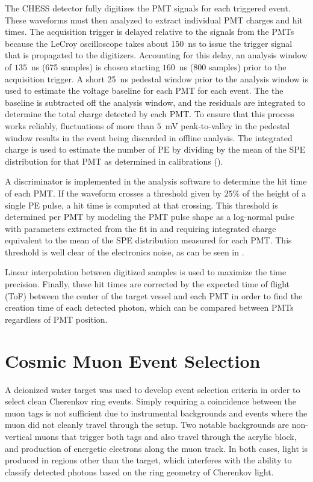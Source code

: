 The CHESS detector fully digitizes the PMT signals for each triggered event.
These waveforms must then analyzed to extract individual PMT charges and hit times. 
The acquisition trigger is delayed relative to the signals from the PMTs because the LeCroy oscilloscope takes about 150~ns to issue the trigger signal that is propagated to the digitizers. 
Accounting for this delay, an analysis window of $135$~ns (675 samples) is chosen starting $160$~ns (800 samples) prior to the acquisition trigger. 
A short 25~ns pedestal window prior to the analysis window is used to estimate the voltage baseline for each PMT for each event.
The the baseline is subtracted off the analysis window, and the residuals are integrated to determine the total charge detected by each PMT. 
To ensure that this process works reliably, fluctuations of more than $5$~mV peak-to-valley in the pedestal window results in the event being discarded in offline analysis.  
The integrated charge is used to estimate the number of PE by dividing by the mean of the SPE distribution for that PMT as determined in calibrations ().

A discriminator is implemented in the analysis software to determine the hit time of each PMT.
If the waveform crosses a threshold given by $25\%$ of the height of a single PE pulse, a hit time is computed at that crossing.
This threshold is determined per PMT by modeling the PMT pulse shape as a log-normal pulse with parameters extracted from the fit in  and requiring integrated charge equivalent to the mean of the SPE distribution measured for each PMT.
This threshold is well clear of the electronics noise, as can be seen in . 

Linear interpolation between digitized samples is used to maximize the time precision. 
Finally, these hit times are corrected by the expected time of flight (ToF) between the center of the target vessel and each PMT in order to find the creation time of each detected photon, which can be compared between PMTs regardless of PMT position.


\section{Cosmic Muon Event Selection}\label{s:event}

A deionized water target was used to develop event selection criteria in order to select clean Cherenkov ring events.
Simply requiring a coincidence between the muon tags is not sufficient due to instrumental backgrounds and events where the muon did not cleanly travel through the setup.
Two notable backgrounds are non-vertical muons that trigger both tags and also travel through the acrylic block, and production of energetic electrons along the muon track.
In both cases, light is produced in regions other than the target, which interferes with the ability to classify detected photons based on the ring geometry of Cherenkov light.

